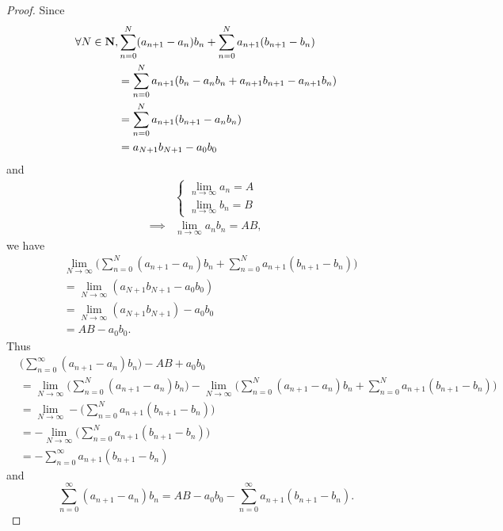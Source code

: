\begin{proof}
    Since
    \begin{align*}
        \forall N \in \mathbf{N}, & \sum_{n = 0}^N (a_{n + 1} - a_n) b_n + \sum_{n = 0}^N a_{n + 1} (b_{n + 1} - b_n) \\
                          & = \sum_{n = 0}^N a_{n + 1} (b_n - a_n b_n + a_{n + 1} b_{n + 1} - a_{n + 1} b_n)  \\
                          & = \sum_{n = 0}^N a_{n + 1} (b_{n + 1} - a_n b_n)                                  \\
                          & = a_{N + 1} b_{N + 1} - a_0 b_0
    \end{align*}
    and
    \begin{align*}
                 & \begin{cases}
                       \lim_{n \to \infty} a_n = A \\
                       \lim_{n \to \infty} b_n = B
                   \end{cases}       \\
        \implies & \lim_{n \to \infty} a_n b_n = AB,
    \end{align*}
    we have
    \begin{align*}
         & \lim_{N \to \infty} \bigg(\sum_{n = 0}^N (a_{n + 1} - a_n) b_n + \sum_{n = 0}^N a_{n + 1} (b_{n + 1} - b_n)\bigg) \\
         & = \lim_{N \to \infty} (a_{N + 1} b_{N + 1} - a_0 b_0)                                                             \\
         & = \lim_{N \to \infty} (a_{N + 1} b_{N + 1}) - a_0 b_0                                                             \\
         & = AB - a_0 b_0.
    \end{align*}
    Thus
    \begin{align*}
         & \bigg(\sum_{n = 0}^\infty (a_{n + 1} - a_n) b_n\bigg) - AB + a_0 b_0                                                                                                                       \\
         & = \lim_{N \to \infty} \bigg(\sum_{n = 0}^N (a_{n + 1} - a_n) b_n\bigg) - \lim_{N \to \infty} \bigg(\sum_{n = 0}^N (a_{n + 1} - a_n) b_n + \sum_{n = 0}^N a_{n + 1} (b_{n + 1} - b_n)\bigg) \\
         & = \lim_{N \to \infty} - \bigg(\sum_{n = 0}^N a_{n + 1} (b_{n + 1} - b_n)\bigg)                                                                                                             \\
         & = - \lim_{N \to \infty} \bigg(\sum_{n = 0}^N a_{n + 1} (b_{n + 1} - b_n)\bigg)                                                                                                             \\
         & = - \sum_{n = 0}^\infty a_{n + 1} (b_{n + 1} - b_n)
    \end{align*}
    and
    \[
        \sum_{n = 0}^\infty (a_{n + 1} - a_n) b_n = AB - a_0 b_0 - \sum_{n = 0}^\infty a_{n + 1} (b_{n + 1} - b_n).
    \]
\end{proof}

